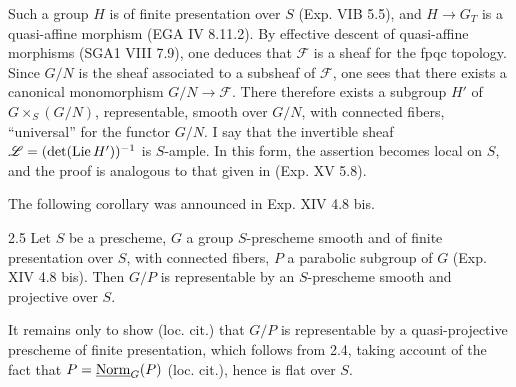 Such a group $H$ is of finite presentation over $S$ (Exp. VIB 5.5), and $H\to G_T$ is a quasi-affine morphism (EGA IV 8.11.2). By effective descent of quasi-affine morphisms (SGA1 VIII 7.9), one deduces that $\mathscr F$ is a sheaf for the fpqc topology. Since $G/N$ is the sheaf associated to a subsheaf of $\mathscr F$, one sees that there exists a canonical monomorphism $G/N\to\mathscr F$. There therefore exists a subgroup $H'$ of $G\times_S(G/N)$, representable, smooth over $G/N$, with connected fibers, ``universal'' for the functor $G/N$. I say that the invertible sheaf $\mathscr L=(\det(\operatorname{Lie} H'))^{-1}$ is $S$-ample. In this form, the assertion becomes local on $S$, and the proof is analogous to that given in (Exp. XV 5.8).

The following corollary was announced in Exp. XIV 4.8 bis.
\begin{corollary}{2.5}\label{XVI.2.5}
Let $S$ be a prescheme, $G$ a group $S$-prescheme smooth and of finite presentation over $S$, with connected fibers, $P$ a parabolic subgroup of $G$ (Exp. XIV 4.8 bis). Then $G/P$ is representable by an $S$-prescheme smooth and projective over $S$.
\end{corollary}
It remains only to show (loc. cit.) that $G/P$ is representable by a quasi-projective prescheme of finite presentation, which follows from 2.4, taking account of the fact that $P=\underline{\mathrm{Norm}}_G(P)$ (loc. cit.), hence is flat over $S$.

